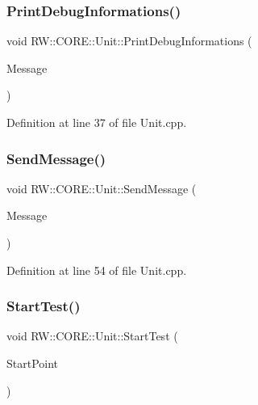 \subsubsection{\texorpdfstring{Print\+Debug\+Informations()}{PrintDebugInformations()}}
{\footnotesize\ttfamily void R\+W\+::\+C\+O\+R\+E\+::\+Unit\+::\+Print\+Debug\+Informations (\begin{DoxyParamCaption}\item[{\hyperlink{namespace_r_w_1_1_c_o_r_e_a571834b44d0e3fab58aa6abfe5a02988}{Message}}]{Message }\end{DoxyParamCaption})\hspace{0.3cm}{\ttfamily [private]}}



Definition at line 37 of file Unit.\+cpp.

\hypertarget{class_r_w_1_1_c_o_r_e_1_1_unit_a5d5854e3dde478770720f302289dbddd}{}\label{class_r_w_1_1_c_o_r_e_1_1_unit_a5d5854e3dde478770720f302289dbddd} 
\subsubsection{\texorpdfstring{Send\+Message()}{SendMessage()}}
{\footnotesize\ttfamily void R\+W\+::\+C\+O\+R\+E\+::\+Unit\+::\+Send\+Message (\begin{DoxyParamCaption}\item[{Q\+Byte\+Array}]{Message }\end{DoxyParamCaption})\hspace{0.3cm}{\ttfamily [private]}}



Definition at line 54 of file Unit.\+cpp.

\hypertarget{class_r_w_1_1_c_o_r_e_1_1_unit_af2a571d5629b2742b603ab88f6c2485c}{}\label{class_r_w_1_1_c_o_r_e_1_1_unit_af2a571d5629b2742b603ab88f6c2485c} 
\subsubsection{\texorpdfstring{Start\+Test()}{StartTest()}}
{\footnotesize\ttfamily void R\+W\+::\+C\+O\+R\+E\+::\+Unit\+::\+Start\+Test (\begin{DoxyParamCaption}\item[{Util\+::\+Functions}]{Start\+Point }\end{DoxyParamCaption})}



